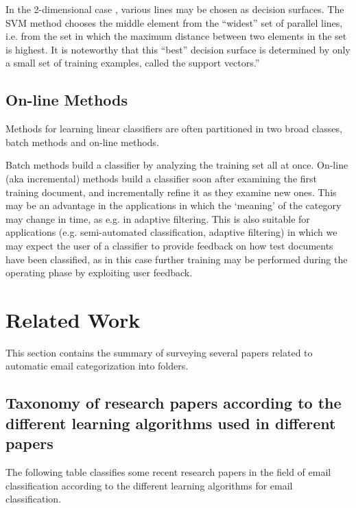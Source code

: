 In the 2-dimensional case , various lines may be chosen as decision surfaces. 
The SVM method chooses the middle element from the ``widest'' set of parallel 
lines, i.e. from the set in which the maximum distance between two elements in 
the set is highest. It is noteworthy that this ``best'' decision surface is 
determined by only a small set of training examples, called the support vectors.''\cite{Sebastiani2002}

\subsection{On-line Methods}
Methods for learning linear classifiers are often partitioned in two broad 
classes, batch methods and on-line methods.

Batch methods build a classifier by analyzing the training set all at once. 
On-line (aka incremental) methods build a classifier soon after examining 
the first training document, and incrementally refine it as they examine new ones. 
This may be an advantage in the applications in which the `meaning' of the 
category may change in time, as e.g. in adaptive filtering. This is also suitable 
for applications (e.g. semi-automated classification, adaptive filtering) in 
which we may expect the user of a classifier to provide feedback on how test 
documents have been classified, as in this case further training may be performed 
during the operating phase by exploiting user feedback.

\newpage
\section{Related Work}
This section contains the summary of surveying several papers related to automatic email categorization into folders.

\label{sec:related_work}

\subsection{Taxonomy of research papers according to the different learning algorithms used in different papers}
The following table classifies some recent research papers in the field of email 
classification according to the different learning algorithms for email classification.

